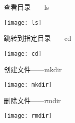 \documentclass{swfubeamer}
\begin{document}
\begin{frame}{查看目录——ls}
  \begin{center}
    \texttt{[image: ls]}
  \end{center}
\end{frame}

\begin{frame}{跳转到指定目录——cd}
  \begin{center}
    \texttt{[image: cd]}
  \end{center}
\end{frame}

\begin{frame}{创建文件——mkdir}
  \begin{center}
    \texttt{[image: mkdir]}
  \end{center}
\end{frame}

\begin{frame}{删除文件——rmdir}
  \begin{center}
    \texttt{[image: rmdir]}
  \end{center}
\end{frame}
\end{document}
